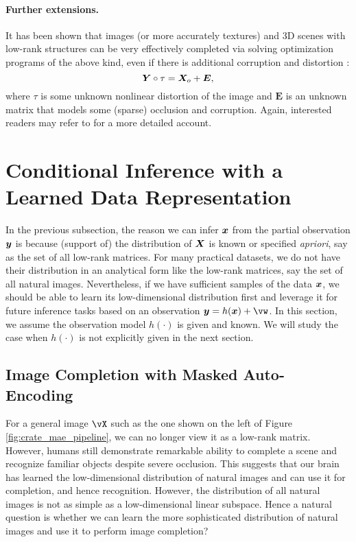 \documentclass[../../book-main.tex]{subfiles}
\begin{document}
\paragraph{Further extensions.}
It has been shown that images (or more accurately textures) and 3D scenes
with low-rank structures can be very effectively completed via
solving optimization programs of the above kind, even if there is
additional corruption and distortion
\cite{Zhang2010TILTTI,Liang-ECCV2012,Yi_2023_ICCV}:
\begin{equation}
    \bm{Y} \circ \tau = \bm{X}_o + \boldsymbol{E},
\end{equation}
where $\tau$ is some unknown nonlinear distortion of the image and $\boldsymbol{E}$ is an unknown matrix that models some (sparse) occlusion and corruption. Again, interested readers may refer to \cite{Wright-Ma-2022} for a more detailed account.

\section{Conditional Inference with a Learned Data Representation}
In the previous subsection, the reason we can infer $\bm{x}$ from the partial observation $\bm{y}$ is because (support of) the distribution of $\bm{X}$ is known or specified {\em apriori}, say as the set of all low-rank matrices. For many practical datasets, we do not have their distribution in an analytical form like the low-rank matrices, say the set of all natural images. Nevertheless, if we have sufficient samples of the data $\bm{x}$, we should be able to learn its low-dimensional distribution first and leverage it for future inference tasks based on an observation $\y = h(\x) + \vw$. In this section, we assume the observation model $h(\cdot)$ is given and known. We will study the case when $h(\cdot)$ is not explicitly given in the next section.


\subsection{Image Completion with Masked Auto-Encoding}
For a general image $\vX$ such as the one shown on the left of Figure
\ref{fig:crate_mae_pipeline}, we can no longer view it as a low-rank
matrix. However, humans still demonstrate remarkable ability to
complete a scene and recognize familiar objects despite severe
occlusion. This suggests that our brain has learned the
low-dimensional distribution of natural images and can use it for
completion, and hence recognition. However, the distribution of all
natural images is not as simple as a low-dimensional linear subspace.
Hence a natural question is whether we can learn the more
sophisticated distribution of natural images and use it to perform
image completion?
\end{document}
